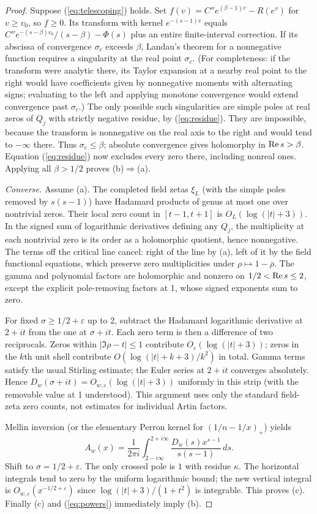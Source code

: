 \documentclass[11pt]{article}
\theoremstyle{remark}\newtheorem{remark}[theorem]{Remark}
\begin{document}
\begin{proof}
Suppose (\ref{eq:telescoping}) holds. Set $f(v)=C''e^{(\beta-1)v}-R(e^v)$ for $v\ge v_0$, so $f\ge0$. Its transform with kernel $e^{-(s-1)v}$ equals $C''e^{-(s-\beta)v_0}/(s-\beta)-\Phi(s)$ plus an entire finite-interval correction. If its abscissa of convergence $\sigma_c$ exceeds $\beta$, Landau's theorem for a nonnegative function requires a singularity at the real point $\sigma_c$. (For completeness: if the transform were analytic there, its Taylor expansion at a nearby real point to the right would have coefficients given by nonnegative moments with alternating signs; evaluating to the left and applying monotone convergence would extend convergence past $\sigma_c$.) The only possible such singularities are simple poles at real zeros of $Q_j$ with strictly negative residue, by (\ref{eq:residue}). They are impossible, because the transform is nonnegative on the real axis to the right and would tend to $-\infty$ there. Thus $\sigma_c\le\beta$; absolute convergence gives holomorphy in $\operatorname{Re} s>\beta$. Equation (\ref{eq:residue}) now excludes every zero there, including nonreal ones. Applying all $\beta>1/2$ proves (b)$\Rightarrow$(a).

\emph{Converse.} Assume (a). The completed field zetas $\xi_L$ (with the simple poles removed by $s(s-1)$) have Hadamard products of genus at most one over nontrivial zeros. Their local zero count in $[t-1,t+1]$ is $O_L(\log(|t|+3))$. In the signed sum of logarithmic derivatives defining any $Q_j$, the multiplicity at each nontrivial zero is its order as a holomorphic quotient, hence nonnegative. The terms off the critical line cancel: right of the line by (a), left of it by the field functional equations, which preserve zero multiplicities under $\rho\mapsto1-\overline\rho$. The gamma and polynomial factors are holomorphic and nonzero on $1/2<\operatorname{Re} s\le2$, except the explicit pole-removing factors at 1, whose signed exponents sum to zero.

For fixed $\sigma\ge1/2+\varepsilon$ up to 2, subtract the Hadamard logarithmic derivative at $2+it$ from the one at $\sigma+it$. Each zero term is then a difference of two reciprocals. Zeros within $|\Im\rho-t|\le1$ contribute $O_\varepsilon(\log(|t|+3))$; zeros in the $k$th unit shell contribute $O(\log(|t|+k+3)/k^2)$ in total. Gamma terms satisfy the usual Stirling estimate; the Euler series at $2+it$ converges absolutely. Hence $D_w(\sigma+it)=O_{w,\varepsilon}(\log(|t|+3))$ uniformly in this strip (with the removable value at 1 understood). This argument uses only the standard field-zeta zero counts, not estimates for individual Artin factors.

Mellin inversion (or the elementary Perron kernel for $(1/n-1/x)_+$) yields
\[
 A_w(x)=\frac1{2\pi i}\int_{2-i\infty}^{2+i\infty}
 \frac{D_w(s)x^{s-1}}{s(s-1)}\,ds.
\]
Shift to $\sigma=1/2+\varepsilon$. The only crossed pole is $1$ with residue $\kappa$. The horizontal integrals tend to zero by the uniform logarithmic bound; the new vertical integral is $O_{w,\varepsilon}(x^{-1/2+\varepsilon})$ since $\log(|t|+3)/(1+t^2)$ is integrable. This proves (c). Finally (c) and (\ref{eq:powers}) immediately imply (b).
\end{proof}
\end{document}
